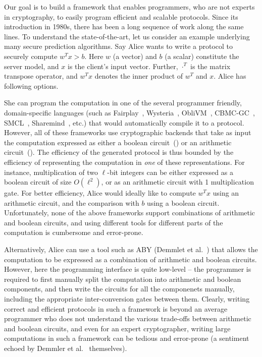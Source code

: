 Our goal is to build a framework that enables programmers, who are not
experts in cryptography, to easily program efficient and scalable \mpc
protocols. Since its introduction in 1980s, there has been a long
sequence of work along the same lines. To understand the
state-of-the-art, let us consider an example underlying many
secure prediction algorithms. Say Alice wants to write
a \mpc protocol to securely
compute $w^Tx >b$. Here $w$ (a vector) and $b$ (a scalar) constitute
the server model, and $x$ is the client's input vector. Further,
$\cdot^{T}$ is the matrix transpose operator, and $w^Tx$ denotes the
inner product of  $w^{T}$ and $x$. Alice has following options.


She can program the computation in one of the several programmer
friendly, domain-specific languages (such
as Fairplay~\cite{fairplay}, Wysteria~\cite{wysteria},
ObliVM~\cite{oblivm}, CBMC-GC~\cite{cbmcgc}, SMCL~\cite{smcl},
Sharemind~\cite{sharemind}, \cite{lambdaps} etc.) that would
automatically compile it to a \mpc protocol. However, all of these
frameworks use cryptographic backends that take as input
the computation expressed as either a boolean
circuit~(\cite{yao,gmw}) or an arithmetic circuit~(\cite{gentry}).
%
The efficiency of the generated \mpc protocol is thus bounded by the
efficiency of representing the computation in \emph{one} of
these representations. For instance, multiplication of two
$\ell$-bit integers can be either expressed as a boolean circuit of
size $O(\ell^2)$, or as an arithmetic circuit with 1 multiplication
gate.
%
For better efficiency, Alice would ideally like to compute
$w^Tx$ using an arithmetic circuit, and the comparison with $b$ using
a boolean circuit.
%
Unfortunately, none of the above frameworks support combinations of
arithmetic and boolean circuits, and using different tools for
different parts of the computation is cumbersome and error-prone.



Alternatively, Alice can use a tool such as ABY (Demmlet et
al.~\cite{aby}) that allows
the computation to be expressed as a combination of arithmetic and
boolean circuits. However, here the programming interface is quite
low-level -- the programmer is required to first manually split the
computation into arithmetic and boolean components, and then write the
circuits for all the componenets manually, including the appropriate
inter-conversion gates between them. Clearly, writing correct
and efficient protocols in such a framework is beyond an average
programmer who does not understand the various trade-offs between
arithmetic and boolean circuits, and even for an expert cryptographer,
writing large computations in such a framework can be tedious and
error-prone (a sentiment echoed by Demmler et al.~\cite{aby} themselves).

